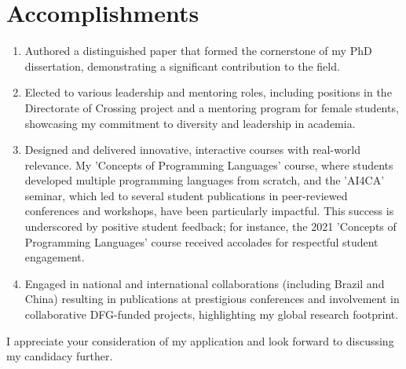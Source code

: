 \documentclass[10pt,a4paper,sans]{moderncv}
\begin{document}
\section*{Accomplishments}
\begin{enumerate}[label=A\arabic*]
\item Authored a distinguished paper that formed the cornerstone of my PhD dissertation, demonstrating a significant contribution to the field.
\item Elected to various leadership and mentoring roles, including positions in the Directorate of Crossing project and a mentoring program for female students, showcasing my commitment to diversity and leadership in academia.
\item Designed and delivered innovative, interactive courses with real-world relevance. My 'Concepts of Programming Languages' course, where students developed multiple programming languages from scratch, and the 'AI4CA' seminar, which led to several student publications in peer-reviewed conferences and workshops, have been particularly impactful. This success is underscored by positive student feedback; for instance, the 2021 'Concepts of Programming Languages' course received accolades for respectful student engagement.
\item Engaged in national and international collaborations (including Brazil and China) resulting in publications at prestigious conferences and involvement in collaborative DFG-funded projects, highlighting my global research footprint.
\end{enumerate}


 I appreciate your consideration of my application and look forward to discussing my candidacy further.

 \makeletterclosing
\end{document}
